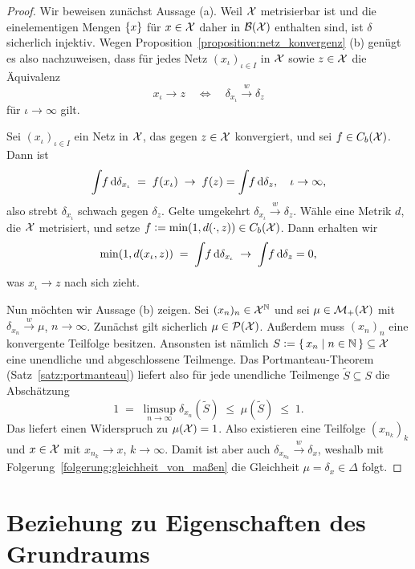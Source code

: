 \documentclass[../thesis/thesis.tex]{subfiles}
\begin{document}
	\begin{proof}
		Wir beweisen zunächst Aussage (a). Weil $\mathcal{X}$ metrisierbar ist und die einelementigen Mengen $\left\{x\right\}$ für $x \in \mathcal{X}$ daher in $\mathcal{B}(\mathcal{X})$ enthalten sind, ist $\delta$ sicherlich injektiv.
		Wegen Proposition~\ref{proposition:netz_konvergenz} (b) genügt es also nachzuweisen, dass für jedes Netz $(x_\iota)_{\iota \in I}$ in $\mathcal{X}$ sowie $z \in \mathcal{X}$ die Äquivalenz
		\[ x_\iota \to z \quad \iff \quad \delta_{x_\iota} \xrightarrow{w} \delta_z \]
		für $\iota \to \infty$ gilt. 
		
		Sei  $(x_\iota)_{\iota \in I}$ ein Netz in $\mathcal{X}$, das gegen $z \in \mathcal{X}$ konvergiert, und sei $f \in C_b(\mathcal{X})$. Dann ist
		\[ \int_{} \, f \, \mathrm{d}\delta_{x_\iota} \; = \; f(x_\iota) \; \to \; f(z) = \int_{} \, f \, \mathrm{d}\delta_{z}, \quad \iota \to \infty \text{,} \]
		also strebt $\delta_{x_\iota}$ schwach gegen $\delta_z$. Gelte umgekehrt $\delta_{x_\iota} \xrightarrow{w} \delta_z$. Wähle eine Metrik $d$, die $\mathcal{X}$ metrisiert, und
		setze $f \vcentcolon = \min (1, d(\cdot, z)) \in C_b(\mathcal{X})$. Dann erhalten wir 
		\[ \min (1, d(x_\iota, z)) \; = \; \int_{} \, f \, \mathrm{d}\delta_{x_\iota} \; \to \; \int_{} \, f \, \mathrm{d}\delta_{z} = 0 \text{,} \]
		was $x_\iota \to z$ nach sich zieht.
		
		Nun möchten wir Aussage (b) zeigen. Sei $(x_n)_n \in \mathcal{X}^{\mathbb{N}}$ und sei $\mu \in \mathcal{M}_{+}(\mathcal{X})$ mit $\delta_{x_n} \xrightarrow{w} \mu$, $n \to \infty$. Zunächst gilt sicherlich $\mu \in \mathcal{P}(\mathcal{X})$.
		Außerdem muss $(x_n)_n$ eine konvergente Teilfolge besitzen. Ansonsten ist nämlich $S \vcentcolon = \left\{\, x_n \; \middle| \; n \in \mathbb{N} \,\right\} \subseteq \mathcal{X}$ eine unendliche und abgeschlossene Teilmenge. Das Portmanteau-Theorem (Satz~\ref{satz:portmanteau}) liefert also für jede unendliche Teilmenge $\tilde{S} \subseteq S$ die Abschätzung
		\[ 1 \; = \; \limsup_{n \to \infty} \delta_{x_n}(\tilde{S}) \; \leq \; \mu(\tilde{S}) \; \leq \; 1 \text{.} \]
		Das liefert einen Widerspruch zu $\mu(\mathcal{X}) = 1$. Also existieren eine Teilfolge $(x_{n_k})_k$ und $x \in \mathcal{X}$ mit $x_{n_k} \to x$, $k \to \infty$. Damit ist aber auch $\delta_{x_{n_k}} \xrightarrow{w} \delta_x$, weshalb mit
		Folgerung~\ref{folgerung:gleichheit_von_maßen} die Gleichheit $\mu = \delta_x \in \Delta$ folgt.
	\end{proof}

	\section{Beziehung zu Eigenschaften des Grundraums}
	\label{subsec:beziehung_zu_eigenschaften_des_grundraums}
	
\end{document}
